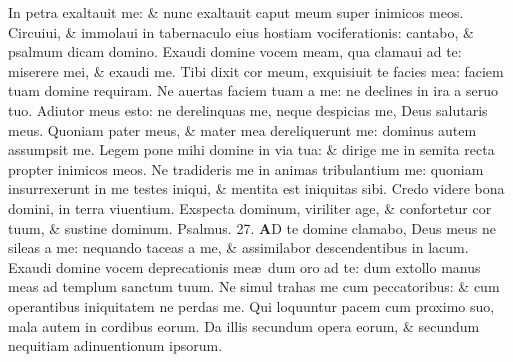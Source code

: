 \documentclass[a5paper,10pt]{book}
\def\ae{æ}
\begin{document}
\begin{multicols*}{2}
\newline \color{red} I\color{black}n petra exaltauit me: \& nunc exaltauit caput meum super inimicos meos.
\newline \color{red} C\color{black}ircuiui, \& immolaui in tabernaculo eius hostiam vociferationis: cantabo, \& psalmum dicam domino.
\newline \color{red} E\color{black}xaudi domine vocem meam, qua clamaui ad te: miserere mei, \& exaudi me.
\newline \color{red} T\color{black}ibi dixit cor meum, exquisiuit te facies mea: faciem tuam domine requiram.
\newline \color{red} N\color{black}e auertas faciem tuam a me: ne declines in ira a seruo tuo.
\newline \color{red} A\color{black}diutor meus esto: ne derelinquas me, neque despicias me, Deus salutaris meus.
\newline \color{red} Q\color{black}uoniam pater meus, \& mater mea dereliquerunt me: dominus autem assumpsit me.
\newline \color{red} L\color{black}egem pone mihi domine in via tua: \& dirige me in semita recta propter inimicos meos.%
\newline \color{red} N\color{black}e tradideris me in animas tribulantium me: quoniam insurrexerunt in me testes iniqui, \& mentita est iniquitas sibi.
\newline \color{red} C\color{black}redo videre bona domini, in terra viuentium.
\newline \color{red} E\color{black}xspecta dominum, viriliter age, \& confortetur cor tuum, \& sustine dominum. \quad \color{red} Psalmus. \hypertarget{ps27}{27.} \color{black}
\vspace{-1em}
\lettrine[lines=2]{\bfseries \color{red} A}{}D te domine clamabo, Deus meus ne sileas a me: nequando taceas a me, \& assimilabor descendentibus in lacum.
\newline \color{red} E\color{black}xaudi domine vocem deprecationis me\ae \ dum oro ad te: dum extollo manus meas ad templum sanctum tuum.
\newline \color{red} N\color{black}e simul trahas me cum peccatoribus: \& cum operantibus iniquitatem ne perdas me.
\newline \color{red} Q\color{black}ui loquuntur pacem cum proximo suo, mala autem in cordibus eorum.
\newline \color{red} D\color{black}a illis secundum opera eorum, \& secundum nequitiam adinuentionum ipsorum.

\end{multicols*}
\end{document}
